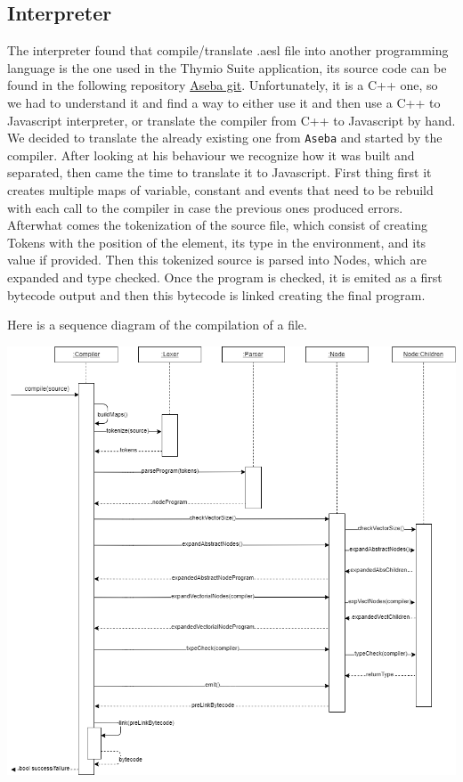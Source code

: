 \documentclass{scrartcl}
\begin{document}
\subsection{Interpreter}
The interpreter found that compile/translate .aesl file into another programming language is the one used in the Thymio Suite application, its source code can be found in the following repository \href{https://github.com/aseba-community/aseba/tree/master/aseba/compiler}{Aseba git}.
Unfortunately, it is a C++ one, so we had to understand it and find a way to either use it and then use a C++ to Javascript interpreter, or translate the compiler from C++ to Javascript by hand.
We decided to translate the already existing one from \texttt{Aseba} and started by the compiler. After looking at his behaviour we recognize how it was built and separated,
then came the time to translate it to Javascript. First thing first it creates multiple maps of variable, constant and events that need to be rebuild with each call to the compiler in case the previous ones produced errors.
Afterwhat comes the tokenization of the source file, which consist of creating Tokens with the position of the element, its type in the environment, and its value if provided. Then this tokenized source is parsed into Nodes, 
which are expanded and type checked. Once the program is checked, it is emited as a first bytecode output and then this bytecode is linked creating the final program.

Here is a sequence diagram of the compilation of a file.
\begin{center}
  \includegraphics[width=\textwidth]{./compiler_sequence_diagram}
\end{center}
\end{document}
